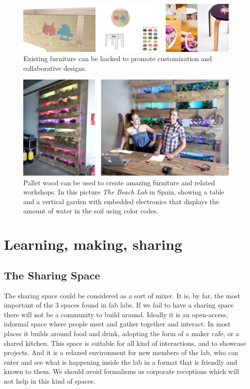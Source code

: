 \documentclass[a4paper,12pt,titlepage]{article}
\begin{document}
\begin{figure}[h] %
   \centering
   \includegraphics[width=16cm]{files/knit} 
   \caption{Existing furniture can be hacked to promote customization and collaborative designs.}
\end{figure}

\begin{figure}[h] %
   \centering
   \includegraphics[width=16cm]{files/pallet} 
   \caption{Pallet wood can be used to create amazing furniture and related workshops. In this
picture \textit{The Beach Lab} in Spain, showing a table and a vertical garden with embedded
electronics that displays the amount of water in the soil using color codes.}
\end{figure}

\clearpage
\section{Learning, making, sharing}
\subsection{The Sharing Space}
The sharing space could be considered as a sort of mixer. It is, by far, the
most important of the 3 spaces
found in fab labs. If we fail to
have a sharing space there will
not be a community to build
around. Ideally it is an open-access, informal space where
people meet and gather
together and interact. In most
places it builds around food
and drink, adopting the form of
a maker cafe, or a shared
kitchen. This space is suitable
for all kind of interactions, and
to showcase projects. And it is
a relaxed environment for new
members of the lab, who can
enter and see what is
happening inside the lab in a
format that is friendly and
known to them. We should
avoid formalisms as corporate
receptions which will not help
in this kind of spaces.
\end{document}
